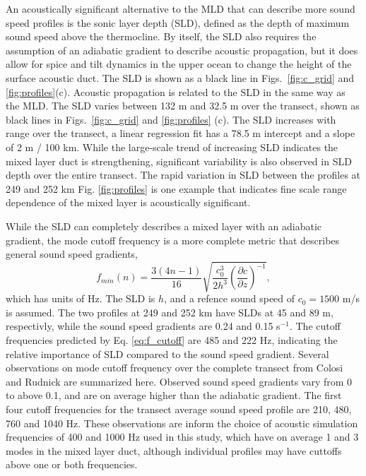 \documentclass[preprint,NumberedRefs]{JASA}
\begin{document}
An acoustically significant alternative to the MLD that can describe more sound speed profiles is the sonic layer depth (SLD), defined as the depth of maximum sound speed above the thermocline. By itself, the SLD also requires the assumption of an adiabatic gradient to describe acoustic propagation, but it does allow for spice and tilt dynamics in the upper ocean to change the height of the surface acoustic duct. The SLD is shown as a black line in Figs.~\ref{fig:c_grid} and \ref{fig:profiles}(c). Acoustic propagation is related to the SLD in the same way as the MLD. The SLD varies between 132 m and 32.5 m over the transect, shown as black lines in Figs.~\ref{fig:c_grid} and \ref{fig:profiles} (c). The SLD increases with range over the transect, a linear regression fit has a 78.5 m intercept and a slope of 2 m / 100 km. While the large-scale trend of increasing SLD indicates the mixed layer duct is strengthening, significant variability is also observed in SLD depth over the entire transect. The rapid variation in SLD between the profiles at 249 and 252 km Fig. \ref{fig:profiles} is one example that indicates fine scale range dependence of the mixed layer is acoustically significant.

While the SLD can completely describes a mixed layer with an adiabatic gradient, the mode cutoff frequency\citep{Urick1982Prop} is a more complete metric that describes general sound speed gradients,
\begin{equation}
    f_{min}(n) = \frac{3(4n-1)}{16} \sqrt{\frac{c_0^3}{2h^3} \left( \frac{\partial c}{\partial z} \right) ^ {-1}},
    \label{eq:f_cutoff}
\end{equation}
which has units of Hz. The SLD is $h$, and a refence sound speed of $c_0 = 1500$ m/s is assumed. The two profiles at 249 and 252 km have SLDs at 45 and 89 m, respectivly, while the sound speed gradients are 0.24 and 0.15 s$^{-1}$. The cutoff frequencies predicted by Eq. \eqref{eq:f_cutoff} are 485 and 222 Hz, indicating the relative importance of SLD compared to the sound speed gradient. Several observations on mode cutoff frequency over the complete transect from Colosi and Rudnick \cite{colosi2020observations} are summarized here. Observed sound speed gradients vary from 0 to above 0.1, and are on average higher than the adiabatic gradient. The first four cutoff frequencies for the transect average sound speed profile are 210, 480, 760 and 1040 Hz. These observations are inform the choice of acoustic simulation frequencies of 400 and 1000 Hz used in this study, which have on average 1 and 3 modes in the mixed layer duct, although individual profiles may have cuttoffs above one or both frequencies.
\end{document}
